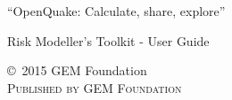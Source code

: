 %
%
%
%
%





% 


\begingroup
\thispagestyle{empty}
\par\normalfont\fontsize{15}{15}\sffamily\selectfont
``OpenQuake: Calculate, share, explore''
\centering
\vspace*{9cm}
\par\normalfont\fontsize{35}{35}\sffamily\selectfont
Risk Modeller's Toolkit - User Guide\par %
\endgroup


\newpage
\vfill
\thispagestyle{empty}

\noindent \copyright\ 2015 GEM Foundation\\ %

\noindent \textsc{Published by GEM Foundation}\\ %

